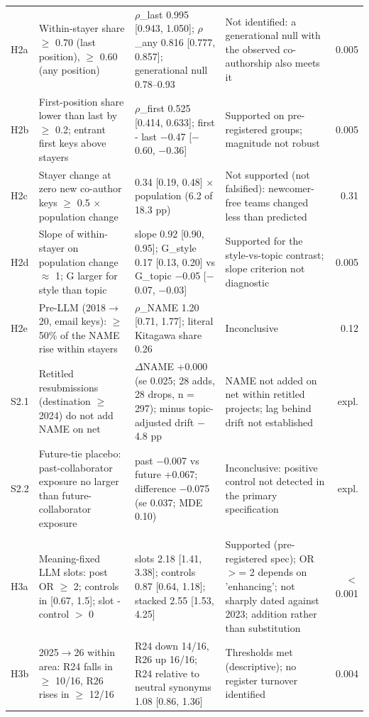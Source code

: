 \begin{table}[t]
\begin{tabular}{l p{3.4cm} p{5.0cm} p{3.6cm} r}
H2a & Within-stayer share $\geq$ 0.70 (last position), $\geq$ 0.60 (any position) & $\rho$\_last 0.995 [0.943, 1.050]; $\rho$\_any 0.816 [0.777, 0.857]; generational null 0.78--0.93 & Not identified: a generational null with the observed co-authorship also meets it & 0.005 \\
H2b & First-position share lower than last by $\geq$ 0.2; entrant first keys above stayers & $\rho$\_first 0.525 [0.414, 0.633]; first - last $-$0.47 [$-$0.60, $-$0.36] & Supported on pre-registered groups; magnitude not robust & 0.005 \\
H2c & Stayer change at zero new co-author keys $\geq$ 0.5 $\times$ population change & 0.34 [0.19, 0.48] $\times$ population (6.2 of 18.3 pp) & Not supported (not falsified): newcomer-free teams changed less than predicted & 0.31 \\
H2d & Slope of within-stayer on population change $\approx$ 1; G larger for style than topic & slope 0.92 [0.90, 0.95]; G\_style 0.17 [0.13, 0.20] vs G\_topic $-$0.05 [$-$0.07, $-$0.03] & Supported for the style-vs-topic contrast; slope criterion not diagnostic & 0.005 \\
H2e & Pre-LLM (2018$\rightarrow$20, email keys): $\geq$ 50\% of the NAME rise within stayers & $\rho$\_NAME 1.20 [0.71, 1.77]; literal Kitagawa share 0.26 & Inconclusive & 0.12 \\
S2.1 & Retitled resubmissions (destination $\geq$ 2024) do not add NAME on net & $\Delta$NAME +0.000 (se 0.025; 28 adds, 28 drops, n = 297); minus topic-adjusted drift $-$4.8 pp & NAME not added on net within retitled projects; lag behind drift not established & expl. \\
S2.2 & Future-tie placebo: past-collaborator exposure no larger than future-collaborator exposure & past $-$0.007 vs future +0.067; difference $-$0.075 (se 0.037; MDE 0.10) & Inconclusive: positive control not detected in the primary specification & expl. \\
\addlinespace
\multicolumn{5}{l}{\textit{D3 The machine register}} \\
H3a & Meaning-fixed LLM slots: post OR $\geq$ 2; controls in [0.67, 1.5]; slot - control $>$ 0 & slots 2.18 [1.41, 3.38]; controls 0.87 [0.64, 1.18]; stacked 2.55 [1.53, 4.25] & Supported (pre-registered spec); OR $>$= 2 depends on 'enhancing'; not sharply dated against 2023; addition rather than substitution & $<$0.001 \\
H3b & 2025$\rightarrow$26 within area: R24 falls in $\geq$ 10/16, R26 rises in $\geq$ 12/16 & R24 down 14/16, R26 up 16/16; R24 relative to neutral synonyms 1.08 [0.86, 1.36] & Thresholds met (descriptive); no register turnover identified & 0.004 \\

\end{tabular}
\end{table}
